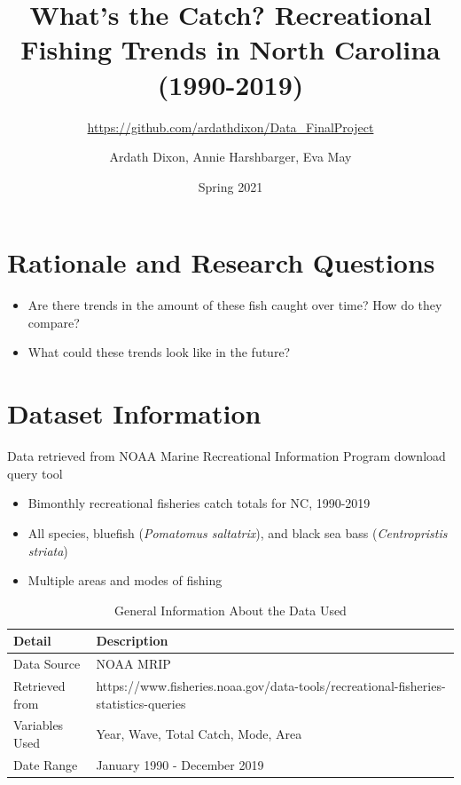 \documentclass[
  12pt,
]{article}
\title{What's the Catch? Recreational Fishing Trends in North Carolina
(1990-2019)}
\subtitle{\url{https://github.com/ardathdixon/Data_FinalProject}}
\author{Ardath Dixon, Annie Harshbarger, Eva May}
\date{Spring 2021}
\begin{document}
\maketitle

\newpage
\tableofcontents 
\newpage
\listoftables 
\newpage
\listoffigures 
\newpage

\hypertarget{rationale-and-research-questions}{%
\section{Rationale and Research
Questions}\label{rationale-and-research-questions}}

\begin{itemize}
\item
  Are there trends in the amount of these fish caught over time? How do
  they compare?
\item
  What could these trends look like in the future?
\end{itemize}

\newpage

\hypertarget{dataset-information}{%
\section{Dataset Information}\label{dataset-information}}

Data retrieved from NOAA Marine Recreational Information Program
download query tool

\begin{itemize}
\item
  Bimonthly recreational fisheries catch totals for NC, 1990-2019
\item
  All species, bluefish (\emph{Pomatomus saltatrix}), and black sea bass
  (\emph{Centropristis striata})
\item
  Multiple areas and modes of fishing
\end{itemize}

\begin{table}[H]

\caption{\label{tab:table1}General Information About the Data Used}
\centering
\begin{tabular}[t]{>{\raggedright\arraybackslash}p{1.5in}|>{\raggedright\arraybackslash}p{5in}}
\hline
Detail & Description\\
\hline
Data Source & NOAA MRIP\\
\hline
Retrieved from & https://www.fisheries.noaa.gov/data-tools/recreational-fisheries-statistics-queries\\
\hline
Variables Used & Year, Wave, Total Catch, Mode, Area\\
\hline
Date Range & January 1990 - December 2019\\
\hline
\end{tabular}
\end{table}
\end{document}
